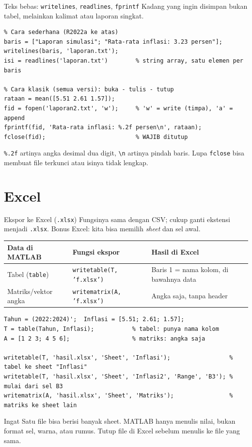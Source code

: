 \documentclass[10pt,aspectratio=169]{beamer}
\newcommand{\kode}[1]{\texttt{\small #1}}
\begin{document}
\begin{frame}[fragile]{Teks bebas: \kode{writelines}, \kode{readlines}, \kode{fprintf}}
  Kadang yang ingin disimpan bukan tabel, melainkan \alert{kalimat atau laporan singkat}.
\begin{lstlisting}
% Cara sederhana (R2022a ke atas)
baris = ["Laporan simulasi"; "Rata-rata inflasi: 3.23 persen"];
writelines(baris, 'laporan.txt');
isi = readlines('laporan.txt')        % string array, satu elemen per baris

% Cara klasik (semua versi): buka - tulis - tutup
rataan = mean([5.51 2.61 1.57]);
fid = fopen('laporan2.txt', 'w');     % 'w' = write (timpa), 'a' = append
fprintf(fid, 'Rata-rata inflasi: %.2f persen\n', rataan);
fclose(fid);                          % WAJIB ditutup
\end{lstlisting}
  \footnotesize \kode{\%.2f} artinya angka desimal dua digit, \kode{\textbackslash n} artinya pindah baris.
  Lupa \kode{fclose} bisa membuat file terkunci atau isinya tidak lengkap.
\end{frame}

\section{Excel}

\begin{frame}[fragile]{Ekspor ke Excel (\kode{.xlsx})}
  Fungsinya \alert{sama dengan CSV}; cukup ganti ekstensi menjadi \kode{.xlsx}.
  Bonus Excel: kita bisa memilih \textit{sheet} dan sel awal.

  \centering\footnotesize
  \begin{tabular}{l l l}
    \toprule
    \textbf{Data di MATLAB} & \textbf{Fungsi ekspor} & \textbf{Hasil di Excel} \\
    \midrule
    Tabel (\kode{table}) & \texttt{writetable(T, 'f.xlsx')}  & Baris 1 = nama kolom, di bawahnya data \\
    Matriks/vektor angka & \texttt{writematrix(A, 'f.xlsx')} & Angka saja, tanpa header \\
    \bottomrule
  \end{tabular}
  \raggedright
\begin{lstlisting}
Tahun = (2022:2024)';  Inflasi = [5.51; 2.61; 1.57];
T = table(Tahun, Inflasi);           % tabel: punya nama kolom
A = [1 2 3; 4 5 6];                  % matriks: angka saja

writetable(T, 'hasil.xlsx', 'Sheet', 'Inflasi');                 % tabel ke sheet "Inflasi"
writetable(T, 'hasil.xlsx', 'Sheet', 'Inflasi2', 'Range', 'B3'); % mulai dari sel B3
writematrix(A, 'hasil.xlsx', 'Sheet', 'Matriks');                % matriks ke sheet lain
\end{lstlisting}
  \begin{alertblock}{Ingat}
    \small Satu file bisa berisi banyak sheet. MATLAB hanya menulis \alert{nilai}, bukan format sel, warna, atau rumus.
    Tutup file di Excel sebelum menulis ke file yang sama.
  \end{alertblock}
\end{frame}
\end{document}
